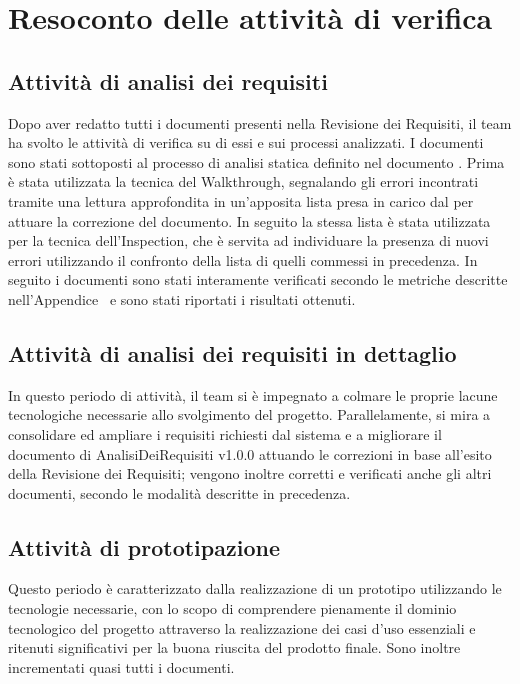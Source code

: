 \newpage
\section{Resoconto delle attività di verifica}
\subsection{Attività di analisi dei requisiti}

Dopo aver redatto tutti i documenti presenti nella Revisione dei Requisiti, il team ha svolto le attività di verifica su di essi e sui processi analizzati. I documenti sono stati sottoposti al processo di analisi statica definito nel documento \NdP{}.
Prima è stata utilizzata la tecnica del Walkthrough, segnalando gli errori incontrati tramite una lettura approfondita in un'apposita lista presa in carico dal \ver{} per attuare la correzione del documento. In seguito la stessa lista è stata utilizzata per la tecnica dell'Inspection, che è servita ad individuare la presenza di nuovi errori utilizzando il confronto della lista di quelli commessi in precedenza.
In seguito i documenti sono stati interamente verificati secondo le metriche descritte nell'Appendice~ e sono stati riportati i risultati ottenuti.

\subsection{Attività di analisi dei requisiti in dettaglio}

In questo periodo di attività, il team si è impegnato a colmare le proprie lacune tecnologiche necessarie allo svolgimento del progetto. Parallelamente, si mira a consolidare ed ampliare i requisiti richiesti dal sistema e a migliorare il documento di AnalisiDeiRequisiti v1.0.0 attuando le correzioni in base all’esito della Revisione dei Requisiti; vengono inoltre corretti e verificati anche gli altri documenti, secondo le modalità descritte in precedenza. 


\subsection{Attività di prototipazione}
Questo periodo è caratterizzato dalla realizzazione di un prototipo utilizzando le tecnologie necessarie, con lo scopo di comprendere pienamente il dominio tecnologico del progetto attraverso la realizzazione dei casi d’uso essenziali e ritenuti
significativi per la buona riuscita del prodotto finale. Sono inoltre incrementati quasi tutti i documenti.



